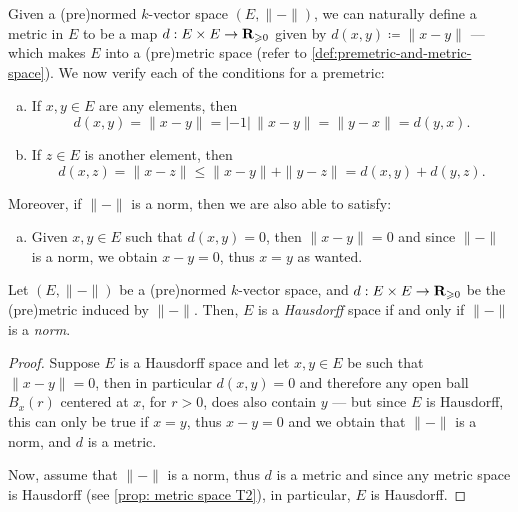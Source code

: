 \begin{example}
\label{exp:metric-from-norm}
Given a (pre)normed \(k\)-vector space \((E, \| - \|)\), we can naturally
define a metric in \(E\) to be a map \(d: E \times E \to \mathbf{R}_{\geqslant 0}\) given by
\(d(x, y) \coloneq \| x - y \|\) --- which makes \(E\) into a (pre)metric
space (refer to \cref{def:premetric-and-metric-space}). We now verify each of
the conditions for a premetric:
\begin{enumerate}[(a)]\setlength\itemsep{0em}
\item If \(x, y \in E\) are any elements, then
\[
  d(x, y) = \| x - y \| = |-1|\, \| x - y \| = \| y - x \| = d(y, x).
\]
\item If \(z \in E\) is another element, then
\[
  d(x, z) = \| x - z \| \leq \| x - y \| + \| y - z \| = d(x, y) + d(y, z).
\]
\end{enumerate}
Moreover, if \(\| - \|\) is a norm, then we are also able to satisfy:
\begin{enumerate}[(a)]\setlength\itemsep{0em}\setcounter{enumi}{2}
\item Given \(x, y \in E\) such that \(d(x, y) = 0\), then \(\| x - y \| = 0\)
and since \(\| - \|\) is a norm, we obtain \(x - y = 0\), thus \(x = y\) as
wanted.
\end{enumerate}
\end{example}

\begin{proposition}
\label{prop:hausdorff-space-norm}
Let \((E, \| - \|)\) be a (pre)normed \(k\)-vector space, and \(d: E \times E
\to \mathbf{R}_{\geqslant 0}\) be the (pre)metric induced by \(\| - \|\). Then, \(E\) is a
\emph{Hausdorff} space if and only if \(\| - \|\) is a \emph{norm}.
\end{proposition}

\begin{proof}
Suppose \(E\) is a Hausdorff space and let \(x, y \in E\) be such that \(\| x -
y \| = 0\), then in particular \(d(x, y) = 0\) and therefore any open ball
\(B_x(r)\) centered at \(x\), for \(r > 0\), does also contain \(y\) --- but
since \(E\) is Hausdorff, this can only be true if \(x = y\), thus \(x - y = 0\)
and we obtain that \(\| - \|\) is a norm, and \(d\) is a metric.

Now, assume that \(\| - \|\) is a norm, thus \(d\) is a metric and since any
metric space is Hausdorff (see \cref{prop: metric space T2}), in particular,
\(E\) is Hausdorff.
\end{proof}

